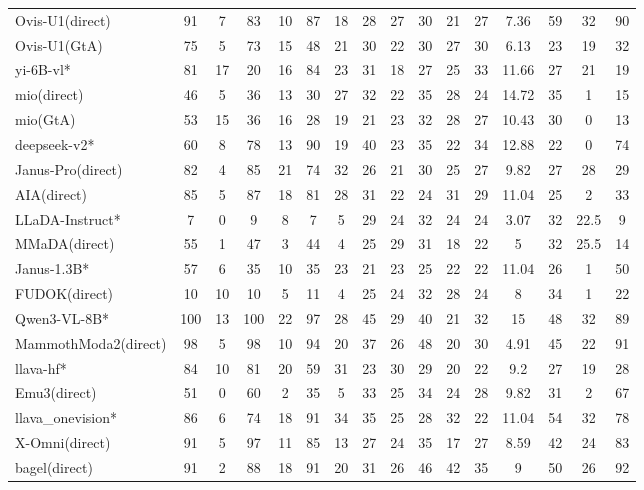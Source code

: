 \documentclass{article}
\providecommand{\rowcolor}[1]{}
\theoremstyle{plain}
\theoremstyle{definition}
\theoremstyle{remark}
\begin{document}
\begin{table}[!htbp]
{\begin{tabular}{@{}lccccccccccccccc@{}}
Ovis-U1(direct) & 91 & 7 & 83 & 10 & 87 & 18 & 28 & 27 & 30 & 21 & 27 & 7.36 & 59 & 32 & 90 \\
Ovis-U1(GtA) & 75 & 5 & 73 & 15 & 48 & 21 & 30 & 22 & 30 & 27 & 30 & 6.13 & 23 & 19 & 32 \\
\midrule
\rowcolor{gray!12}
yi-6B-vl* & 81 & 17 & 20 & 16 & 84 & 23 & 31 & 18 & 27 & 25 & 33 & 11.66 & 27 & 21 & 19 \\
mio(direct) & 46 & 5 & 36 & 13 & 30 & 27 & 32 & 22 & 35 & 28 & 24 & 14.72 & 35 & 1 & 15 \\
mio(GtA) & 53 & 15 & 36 & 16 & 28 & 19 & 21 & 23 & 32 & 28 & 27 & 10.43 & 30 & 0 & 13 \\
\midrule
\rowcolor{gray!12}
deepseek-v2* & 60 & 8 & 78 & 13 & 90 & 19 & 40 & 23 & 35 & 22 & 34 & 12.88 & 22 & 0 & 74 \\
Janus-Pro(direct) & 82 & 4 & 85 & 21 & 74 & 32 & 26 & 21 & 30 & 25 & 27 & 9.82 & 27 & 28 & 29 \\
AIA(direct) & 85 & 5 & 87 & 18 & 81 & 28 & 31 & 22 & 24 & 31 & 29 & 11.04 & 25 & 2 & 33 \\
\midrule
\rowcolor{gray!12}
LLaDA-Instruct* & 7 & 0 & 9 & 8 & 7 & 5 & 29 & 24 & 32 & 24 & 24 & 3.07 & 32 & 22.5 & 9 \\
MMaDA(direct) & 55 & 1 & 47 & 3 & 44 & 4 & 25 & 29 & 31 & 18 & 22 & 5 & 32 & 25.5 & 14 \\
\midrule
\rowcolor{gray!12}
Janus-1.3B* & 57 & 6 & 35 & 10 & 35 & 23 & 21 & 23 & 25 & 22 & 22 & 11.04 & 26 & 1 & 50 \\
FUDOK(direct) & 10 & 10 & 10 & 5 & 11 & 4 & 25 & 24 & 32 & 28 & 24 & 8 & 34 & 1 & 22 \\
\midrule
\rowcolor{gray!12}
Qwen3-VL-8B* & 100 & 13 & 100 & 22 & 97 & 28 & 45 & 29 & 40 & 21 & 32 & 15 & 48 & 32 & 89 \\
MammothModa2(direct) & 98 & 5 & 98 & 10 & 94 & 20 & 37 & 26 & 48 & 20 & 30 & 4.91 & 45 & 22 & 91 \\
\midrule
\rowcolor{gray!12}
llava-hf* & 84 & 10 & 81 & 20 & 59 & 31 & 23 & 30 & 29 & 20 & 22 & 9.2 & 27 & 19 & 28 \\
Emu3(direct) & 51 & 0 & 60 & 2 & 35 & 5 & 33 & 25 & 34 & 24 & 28 & 9.82 & 31 & 2 & 67 \\
\midrule
\rowcolor{gray!12}
llava\_onevision* & 86 & 6 & 74 & 18 & 91 & 34 & 35 & 25 & 28 & 32 & 22 & 11.04 & 54 & 32 & 78 \\
X-Omni(direct) & 91 & 5 & 97 & 11 & 85 & 13 & 27 & 24 & 35 & 17 & 27 & 8.59 & 42 & 24 & 83 \\
bagel(direct) & 91 & 2 & 88 & 18 & 91 & 20 & 31 & 26 & 46 & 42 & 35 & 9 & 50 & 26 & 92 \\

\end{tabular}}
\end{table}
\end{document}
